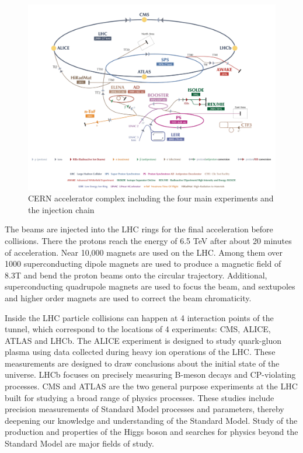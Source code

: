 \begin{figure}[htbp]
\begin{center}
\includegraphics[width=0.72\linewidth]{figures/lhc_lhc.pdf}
\caption{CERN accelerator complex including the four main experiments and the injection chain}
\label{fig:lhc_lhc}
\end{center}
\end{figure}

\vspace{0.3cm}
The beams are injected into the LHC rings for the final acceleration before collisions. There the protons reach the energy of 6.5 TeV after about 20 minutes of acceleration. Near 10,000 magnets are used on the LHC. Among them over 1000 superconducting dipole magnets are used to produce a magnetic field of 8.3T and bend the proton beams onto the circular trajectory. Additional, superconducting quadrupole magnets are used to focus the beam, and sextupoles and higher order magnets are used to correct the beam chromaticity.

\vspace{0.3cm}
Inside the LHC particle collisions can happen at 4 interaction points of the tunnel, which correspond to the locations of 4 experiments: CMS, ALICE, ATLAS and LHCb. The ALICE experiment is designed to study quark-gluon plasma using data collected during heavy ion operations of the LHC. These measurements are designed to draw conclusions about the initial state of the universe. LHCb focuses on precisely measuring B-meson decays and CP-violating processes. CMS and ATLAS are the two general purpose experiments at the LHC built for studying a broad range of physics processes. These studies include precision measurements of Standard Model processes and parameters, thereby deepening our knowledge and understanding of the Standard Model. Study of the production and properties of the Higgs boson and searches for physics beyond the Standard Model are major fields of study.

